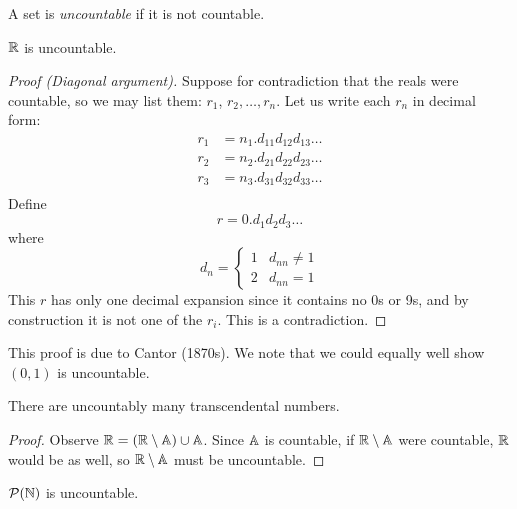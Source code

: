 \documentclass{../../template/note}
\begin{document}
    \begin{definition}[Uncountability]
        A set is \emph{uncountable} if it is not countable.
    \end{definition}
    

    \begin{theorem}
        \(\RR\) is uncountable.
    \end{theorem}
    
    \begin{proof}[Proof (Diagonal argument)]
        Suppose for contradiction that the reals were countable, so we may list them: \(r_1\), \(r_2, \dots, r_n\). Let us write each \(r_n\) in decimal form:
        \begin{align*}
            r_1 &= n_1.d_{11}d_{12}d_{13}\dots \\
            r_2 &= n_2.d_{21}d_{22}d_{23}\dots \\
            r_3 &= n_3.d_{31}d_{32}d_{33}\dots \\
        \end{align*}
        Define
        \[
            r = 0.d_1d_2d_3\dots
        \]
        where
        \[
            d_n = \begin{cases}
                1 & d_{nn} \neq 1 \\
                2 & d_{nn} = 1
            \end{cases}
        \]
        This \(r\) has only one decimal expansion since it contains no 0s or 9s, and by construction it is not one of the \(r_i\). This is a contradiction.
    \end{proof}
    
    This proof is due to Cantor (1870s). We note that we could equally well show \((0, 1)\) is uncountable.

    \begin{corollary}
        There are uncountably many transcendental numbers.
    \end{corollary}
    
    \begin{proof}
        Observe \(\RR = (\RR \setminus \AA) \cup \AA\). Since \(\AA\) is countable, if \(\RR \setminus \AA\) were countable, \(\RR\) would be as well, so \(\RR \setminus \AA\) must be uncountable.
    \end{proof}
    
    \begin{theorem}
        \(\mathcal P(\NN)\) is uncountable.
    \end{theorem}
    
\end{document}
